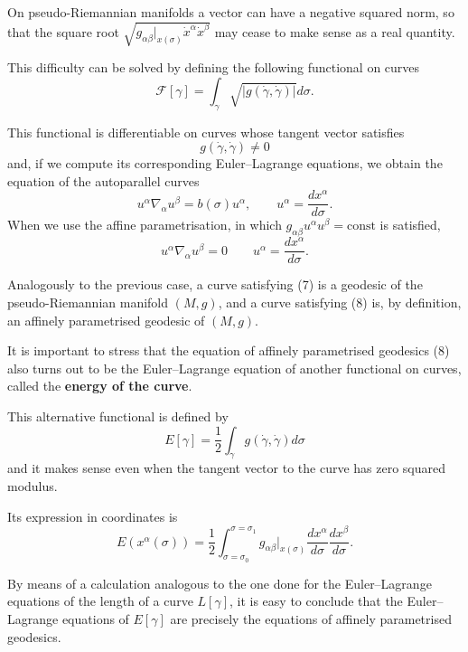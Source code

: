 \begin{points}
\item On pseudo-Riemannian manifolds a vector can have a negative squared norm, so that the square root $\sqrt{g_{\alpha\beta}|_{x(\sigma)}\dot x^\alpha\dot x^\beta}$ may cease to make sense as a real quantity.

\item This difficulty can be solved by defining the following functional on curves
\[
  \mathcal F[\gamma]=\int_\gamma\sqrt{|g(\dot\gamma,\dot\gamma)|}d\sigma .
\]

\item This functional is differentiable on curves whose tangent vector satisfies
\[
  g(\dot\gamma,\dot\gamma)\neq0
\]
and, if we compute its corresponding Euler--Lagrange equations, we obtain the equation of the autoparallel curves
\begin{equation}
  u^\alpha\nabla_\alpha u^\beta=b(\sigma)u^\alpha,\qquad u^\alpha=\frac{dx^\alpha}{d\sigma} .
\end{equation}
When we use the affine parametrisation, in which $g_{\alpha\beta}u^\alpha u^\beta=\text{const}$ is satisfied,
\begin{equation}
  u^\alpha\nabla_\alpha u^\beta=0\qquad u^\alpha=\frac{dx^\alpha}{d\sigma} .
\end{equation}

\item Analogously to the previous case, a curve satisfying (7) is a geodesic of the pseudo-Riemannian manifold $(M,g)$, and a curve satisfying (8) is, by definition, an affinely parametrised geodesic of $(M,g)$.

\item It is important to stress that the equation of affinely parametrised geodesics (8) also turns out to be the Euler--Lagrange equation of another functional on curves, called the \textbf{energy of the curve}.

\item This alternative functional is defined by
\[
  E[\gamma]=\frac12\int_\gamma g(\dot\gamma,\dot\gamma)d\sigma
\]
and it makes sense even when the tangent vector to the curve has zero squared modulus.

\item Its expression in coordinates is
\[
  E(x^\alpha(\sigma))=\frac12\int_{\sigma=\sigma_0}^{\sigma=\sigma_1}g_{\alpha\beta}|_{x(\sigma)}\frac{dx^\alpha}{d\sigma}\frac{dx^\beta}{d\sigma} .
\]

\item By means of a calculation analogous to the one done for the Euler--Lagrange equations of the length of a curve $L[\gamma]$, it is easy to conclude that the Euler--Lagrange equations of $E[\gamma]$ are precisely the equations of affinely parametrised geodesics.


\end{points}
